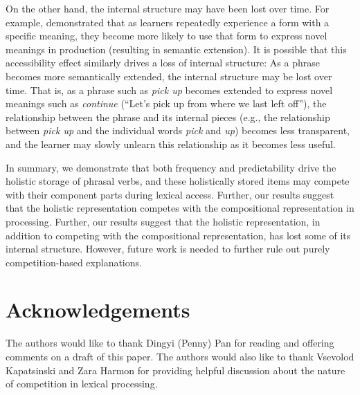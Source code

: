 \documentclass[
  authoryear,
  preprint,
  1p,
  onecolumn]{elsarticle}
\begin{document}
On the other hand, the internal structure may have been lost over time.
For example, \citet{harmonPuttingOldTools2017} demonstrated that as
learners repeatedly experience a form with a specific meaning, they
become more likely to use that form to express novel meanings in
production (resulting in semantic extension). It is possible that this
accessibility effect similarly drives a loss of internal structure: As a
phrase becomes more semantically extended, the internal structure may be
lost over time. That is, as a phrase such as \emph{pick up} becomes
extended to express novel meanings such as \emph{continue} (``Let's pick
up from where we last left off''), the relationship between the phrase
and its internal pieces (e.g., the relationship between \emph{pick up}
and the individual words \emph{pick} and \emph{up}) becomes less
transparent, and the learner may slowly unlearn this relationship as it
becomes less useful.

In summary, we demonstrate that both frequency and predictability drive
the holistic storage of phrasal verbs, and these holistically stored
items may compete with their component parts during lexical access.
Further, our results suggest that the holistic representation competes
with the compositional representation in processing. Further, our
results suggest that the holistic representation, in addition to
competing with the compositional representation, has lost some of its
internal structure. However, future work is needed to further rule out
purely competition-based explanations.

\section{Acknowledgements}\label{acknowledgements}

The authors would like to thank Dingyi (Penny) Pan for reading and
offering comments on a draft of this paper. The authors would also like
to thank Vsevolod Kapatsinski and Zara Harmon for providing helpful
discussion about the nature of competition in lexical processing.

\newpage


  
\end{document}
